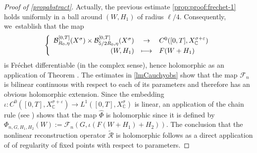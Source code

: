 \documentclass[11pt]{article}
\providecommand{\dpl}{\displaystyle}
\newcommand\mto{\mathchoice{\longmapsto}{\mapsto}{\mapsto}{\mapsto}}
\theoremstyle{definition}
\let\mc\mathcal
\let\veps\varepsilon
\newcommand{\B}{\mc{B}}
\newcommand\FL{\mathcal{F}_{n}}
\begin{document}
\begin{proof}[Proof of \cref{propabstract}]
Actually, the previous estimate \eqref{prop:proof:frechet-1} holds uniformly in a ball around $(W, H_1)$ of radius $\ell/4$. Consequently, we~establish that the map
\begin{align*}
\left\{\begin{array}{rcl}
\B_{R_{0}, \eta}^{[0,T]}(X^{\sigma}) \times \B_{5/2R_{0}, \eta}^{[0,T]}(X^{\sigma}) &\dpl\to& C^0([0, T], X_\mathbb{C}^{\sigma+\veps})\\[3pt]
(W, H_1 )&\dpl\mto& F(W+H_1)
\end{array}\right.
\end{align*}
is Fréchet differentiable (in the complex sense), hence holomorphic as an application of Theorem \cite[Th.\,13.16]{Muj86}. The estimates in \cref{lmCauchyobs} show that the map $\FL$ is bilinear continuous with respect to each of its parameters and therefore has an obvious holomorphic extension. Since the embedding $\iota: C^0([0,T],X_{\mathbb{C}}^{\sigma+\veps})\to L^1([0,T],X_{\mathbb{C}}^{\sigma})$ is linear, an application of the chain rule (see \cite[Th.\,13.6]{Muj86}) shows that the map $\widehat{\Phi}$ is holomorphic since it is defined by $\Phi_{n,G,H_{1},H_{2}}(W):=\FL (G,\iota\left(F(W+H_{1})+H_{2}\right)) $. The conclusion that the nonlinear reconstruction operator $\mathcal{\widetilde{R}}$ is holomorphic follows as a direct application of \cite[Th.\,2.2]{1982:chow-hale:bifurcation-theory} of regularity of fixed points with respect to parameters.
\end{proof}
\end{document}
